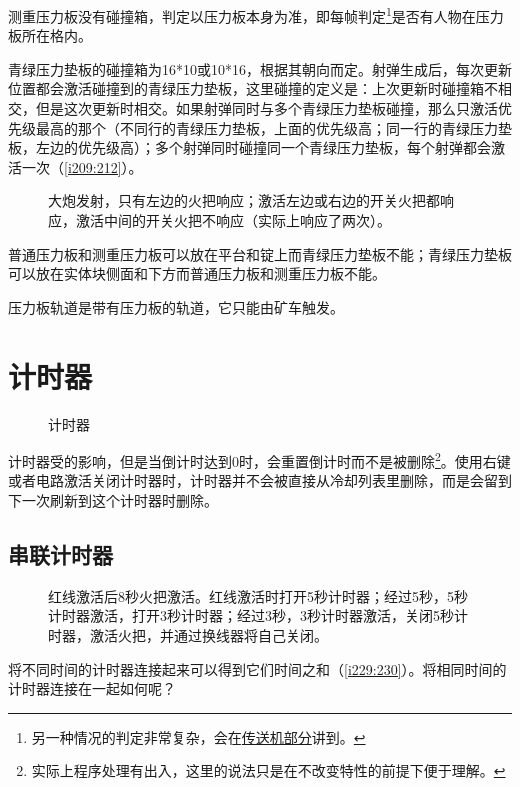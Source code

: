 测重压力板没有碰撞箱，判定以压力板本身为准，即每帧判定\footnote{另一种情况的判定非常复杂，会在\hyperref[sec9]{传送机部分}讲到。}是否有人物在压力板所在格内。

青绿压力垫板的碰撞箱为16*10或10*16，根据其朝向而定。射弹生成后，每次更新位置都会激活碰撞到的青绿压力垫板，这里碰撞的定义是：上次更新时碰撞箱不相交，但是这次更新时相交。如果射弹同时与多个青绿压力垫板碰撞，那么只激活优先级最高的那个（不同行的青绿压力垫板，上面的优先级高；同一行的青绿压力垫板，左边的优先级高）；多个射弹同时碰撞同一个青绿压力垫板，每个射弹都会激活一次（\autoref{i209:212}）。

\begin{figure}[!ht]
\begin{center}
\qquad
{}
\end{center}
\caption{\protect{}大炮发射，只有左边的火把响应；\protect{}激活左边或右边的开关火把都响应，激活中间的开关火把不响应（实际上响应了两次）。}
\label{i209:212}
\end{figure}

普通压力板和测重压力板可以放在平台和锭上而青绿压力垫板不能；青绿压力垫板可以放在实体块侧面和下方而普通压力板和测重压力板不能。

压力板轨道是带有压力板的轨道，它只能由矿车触发。

\section{计时器}
\begin{figure}[!ht]
\centering
{}\quad{}\quad{}\quad{}\quad{}
\caption{计时器}
\end{figure}

计时器受的影响，但是当倒计时达到0时，会重置倒计时而不是被删除\footnote{实际上程序处理有出入，这里的说法只是在不改变特性的前提下便于理解。}。使用右键或者电路激活关闭计时器时，计时器并不会被直接从冷却列表里删除，而是会留到下一次刷新到这个计时器时删除。

\subsection{串联计时器}\label{sec20}
\begin{figure}[!ht]
\begin{center}
\qquad
{}
\end{center}
\caption{红线激活后8秒火把激活。红线激活时打开5秒计时器；经过5秒，5秒计时器激活，打开3秒计时器；经过3秒，3秒计时器激活，关闭5秒计时器，激活火把，并通过换线器将自己关闭。}
\label{i229:230}
\end{figure}
将不同时间的计时器连接起来可以得到它们时间之和（\autoref{i229:230}）。将相同时间的计时器连接在一起如何呢？

